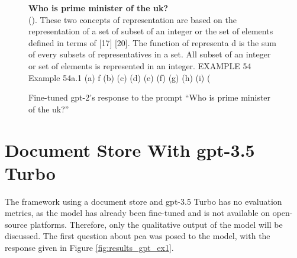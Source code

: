 \begin{figure}[ht!]
    \begin{itquote}
        \textbf{Who is prime minister of the uk?} \\ 
        (). These two concepts of  representation are based on the representation of a set of  subset of an integer or the set of elements defined in terms of [17] [20]. The function of representa d is  the sum of every subsets of  representatives in a set. All subset  of an integer or set of elements is represented in an integer. EXAMPLE 54 Example 54a.1  (a) f (b)  (c)  (d)  (e)  (f)  (g)   (h)  (i)  (
    \end{itquote}
    \caption{Fine-tuned \acrshort{gpt}-2's response to the prompt ``Who is prime minister of the uk?''}
    \label{fig:results_mlm_ex3}
\end{figure}

\section{Document Store With \acrshort{gpt}-3.5 Turbo}\label{sec:results_gpt_turbo}
The framework using a document store and \acrshort{gpt}-3.5 Turbo has no evaluation metrics, as the model has already been fine-tuned and is not available on open-source platforms. Therefore, only the qualitative output of the model will be discussed. The first question about \acrshort{pca} was posed to the model, with the response given in Figure \ref{fig:results_gpt_ex1}.

